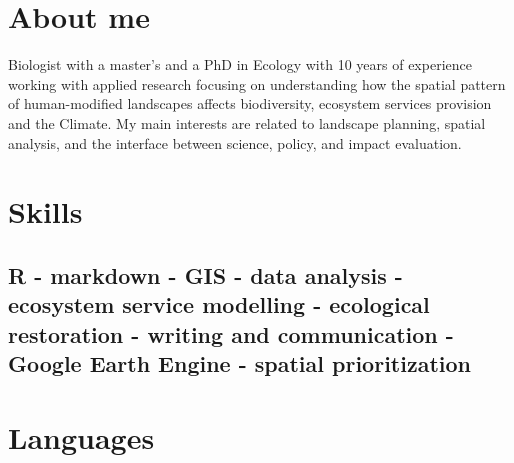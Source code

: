 \documentclass[11pt,a4paper,]{awesome-cv}
\begin{document}
\makecvheader






\hypertarget{about-me}{%
\section{About me}\label{about-me}}

Biologist with a master's and a PhD in Ecology with 10 years of
experience working with applied research focusing on understanding how
the spatial pattern of human-modified landscapes affects biodiversity,
ecosystem services provision and the Climate. My main interests are
related to landscape planning, spatial analysis, and the interface
between science, policy, and impact evaluation.

\hypertarget{skills}{%
\section{Skills}\label{skills}}

\hypertarget{r---markdown---gis---data-analysis---ecosystem-service-modelling---ecological-restoration---writing-and-communication---google-earth-engine---spatial-prioritization}{%
\subsection{R - markdown - GIS - data analysis - ecosystem service
modelling - ecological restoration - writing and communication - Google
Earth Engine - spatial
prioritization}\label{r---markdown---gis---data-analysis---ecosystem-service-modelling---ecological-restoration---writing-and-communication---google-earth-engine---spatial-prioritization}}

\hypertarget{languages}{%
\section{Languages}\label{languages}}
\end{document}
